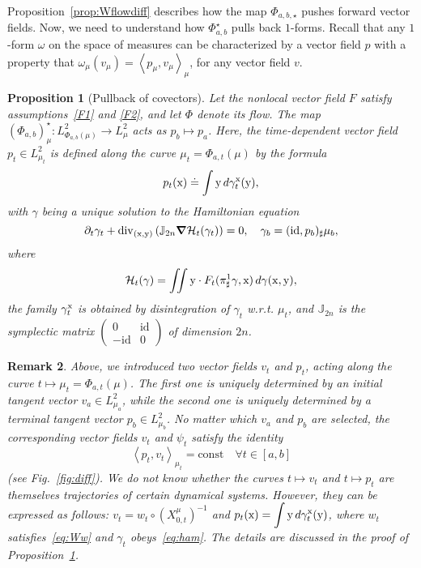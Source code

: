 \documentclass[sn-mathphys-num]{sn-jnl}
\numberwithin{equation}{section}
\theoremstyle{mythm}
\newtheorem{proposition}{Proposition}[section]
\theoremstyle{mydef}
\newtheorem{remark}[proposition]{Remark}
\renewcommand{\d}{\,d}
\newcommand{\id}{\mathrm{id}}
\begin{document}
Proposition~\ref{prop:Wflowdiff} describes how the map \( \Phi_{a,b,\star} \) pushes forward vector fields.
Now, we need to understand how \( \Phi_{a,b}^{\star} \) pulls back \( 1 \)-forms.
Recall that any \( 1 \)-form \( \omega \) on the space of measures can be characterized by a vector field \( p \) with a property that \( \omega_{\mu}(v_{\mu})=\left< p_{\mu},v_{\mu} \right>_{\mu}\), for any vector field \( v \).

\begin{proposition}[Pullback of covectors]
  \label{prop:Wpull}
Let the nonlocal vector field \( F \) satisfy assumptions~\ref{F1}
and \ref{F2}, and let \( \Phi \) denote its flow.
  The map \( (\Phi_{a,b})^{\star}_{\mu}\colon L^2_{\Phi_{a,b}(\mu)}\to L^{2}_{\mu} \) acts as \(
  p_b \mapsto p_a \).
  Here, the time-dependent vector field \( p_t\in L^2_{\mu_t} \) is defined along the curve \( \mu_t = \Phi_{a,t}(\mu) \) by the formula
  \[
  p_t({\rm x}) \doteq \int {\rm y}\d \gamma^{\rm x}_t({\rm y}), %
  \]
with \( \gamma \) being a unique solution to the Hamiltonian equation
  \begin{equation}
    \label{eq:ham}
\partial_t \gamma_t + \mathrm{div}_{({\rm x,y})}\left( {\mathbb J}_{2n}\bm \nabla\mathcal{H}_t(\gamma_{t})\right) = 0,\quad \gamma_b = (\id, p_b)_{\sharp}\mu_b,
  \end{equation}
where
\[
\mathcal{H}_t(\gamma) = \iint{\rm  y}\cdot F_t(\pi^1_{\sharp}\gamma,{\rm x})\d \gamma({\rm x,y}),
\]
the family \( \gamma^{\rm x}_t \) is obtained by disintegration of \( \gamma_t \) w.r.t. \(\mu_t\), and \( \mathbb J_{2n} \) is the symplectic matrix $\left(\begin{array}{cc}
    0 & \id  \\
   -\id  & 0
\end{array}\right)$ of dimension \( {2n} \).
\end{proposition}

\begin{remark}
  Above, we introduced two vector fields \( v_t \) and \( p_t \), acting along the curve \( t \mapsto \mu_t = \Phi_{a,t}(\mu) \).
  The first one is uniquely determined by an initial tangent vector \( v_a\in L^2_{\mu_a} \), while the second one
  is uniquely determined by a terminal tangent vector \( p_{b}\in L^2_{\mu_b} \).
  No matter which \( v_a \) and \( p_b \) are selected, the corresponding vector fields \( v_t \) and \( \psi_t \) satisfy the identity
  \[
    \left< p_t,v_t \right>_{\mu_t} = \text{const} \quad \forall t\in [a,b]
  \]
  (see Fig.~\ref{fig:diff}).
  We do not know whether the curves \( t\mapsto v_t \) and \( t\mapsto p_t \) are themselves trajectories of certain dynamical systems.
  However,  they can be expressed as follows: \( v_t = w_t\circ (X^{\mu}_{0,t})^{-1} \) and \( p_t(\mathrm{x}) = \displaystyle \int \mathrm y\d\gamma_t^{\rm x}(\mathrm y) \), where \( w_t \) satisfies~\eqref{eq:Ww} and \( \gamma_t \) obeys~\eqref{eq:ham}.
  The details are discussed in the proof of Proposition~\ref{prop:Wpull}.
\end{remark}
\end{document}
